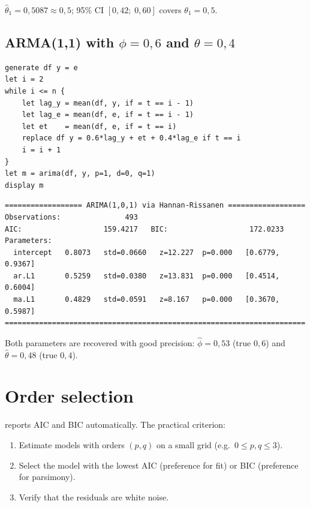 $\hat\theta_1 = 0{,}5087 \approx 0{,}5$; 95\% CI $[0{,}42;\; 0{,}60]$
covers $\theta_1 = 0{,}5$.

\subsection*{ARMA(1,1) with $\phi=0{,}6$ and $\theta=0{,}4$}

\begin{lstlisting}[caption={ARMA(1{,}1) DGP and estimation}]
generate df y = e
let i = 2
while i <= n {
    let lag_y = mean(df, y, if = t == i - 1)
    let lag_e = mean(df, e, if = t == i - 1)
    let et    = mean(df, e, if = t == i)
    replace df y = 0.6*lag_y + et + 0.4*lag_e if t == i
    i = i + 1
}
let m = arima(df, y, p=1, d=0, q=1)
display m
\end{lstlisting}

\begin{lstlisting}[language={}, basicstyle=\ttfamily\small,
  frame=none, numbers=none, backgroundcolor=\color{codbg},
  xleftmargin=0pt, xrightmargin=0pt, breaklines=false]
================== ARIMA(1,0,1) via Hannan-Rissanen ==================
Observations:               493
AIC:                   159.4217   BIC:                   172.0233
Parameters:
  intercept   0.8073   std=0.0660   z=12.227  p=0.000   [0.6779, 0.9367]
  ar.L1       0.5259   std=0.0380   z=13.831  p=0.000   [0.4514, 0.6004]
  ma.L1       0.4829   std=0.0591   z=8.167   p=0.000   [0.3670, 0.5987]
======================================================================
\end{lstlisting}

Both parameters are recovered with good precision: $\hat\phi = 0{,}53$
(true $0{,}6$) and $\hat\theta = 0{,}48$ (true $0{,}4$).

\section{Order selection}

\hayashi{} reports AIC and BIC automatically. The practical criterion:

\begin{enumerate}
  \item Estimate models with orders $(p,q)$ on a small grid (e.g.\ $0
        \leq p,q \leq 3$).
  \item Select the model with the lowest AIC (preference for fit) or BIC
        (preference for parsimony).
  \item Verify that the residuals are white noise.
\end{enumerate}

